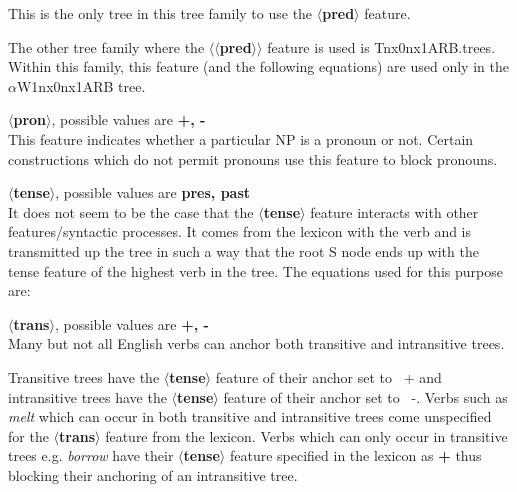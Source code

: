 This is the only tree in this tree family to use the 
{\bf $\langle$pred$\rangle$} feature.

The other tree family where the {\bf $\langle$$\langle$pred$\rangle$$\rangle$} feature is
used is Tnx0nx1ARB.trees.  Within this family, this feature (and the
following equations) are used only in the $\alpha$W1nx0nx1ARB tree.



{\bf $\langle$pron$\rangle$}, possible values are {\bf +, -}\\
This feature indicates whether a particular NP is a pronoun or not. 
Certain constructions which do not permit pronouns use this 
feature to block pronouns.

{\bf $\langle$tense$\rangle$}, possible values are {\bf pres, past}\\
It does not seem to be the case that the {\bf $\langle$tense$\rangle$}
feature interacts with other features/syntactic processes. It 
comes from the lexicon with the verb and is transmitted up the
tree in such a way that the root S node ends up with the
tense feature of the highest verb in the tree. The equations
used for this purpose are:



{\bf $\langle$trans$\rangle$}, possible values are {\bf +, -}\\
Many but not all English verbs can anchor both transitive and intransitive trees.


Transitive trees have the {\bf $\langle$tense$\rangle$} feature of their
anchor set to {\ +} and intransitive trees have the 
{\bf $\langle$tense$\rangle$} feature of their
anchor set to {\ -}. Verbs such as {\em melt} which can occur 
in both transitive and intransitive trees come unspecified for the 
{\bf $\langle$trans$\rangle$} feature from the lexicon. Verbs which 
can only occur in transitive trees e.g. {\em borrow} have their
{\bf $\langle$tense$\rangle$} feature 
specified in the lexicon as {\bf +} thus blocking their anchoring of 
an intransitive tree.


